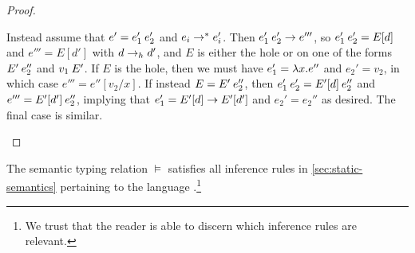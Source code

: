\begin{proof}
\begin{proofsec*}
    Instead assume that $e' = \expApp{e_1'}{e_2'}$ and $e_i \to^* e_i'$. Then $\expApp{e_1'}{e_2'} \step e'''$, so $\expApp{e_1'}{e_2'} = E[d]$ and $e''' = E[d']$ with $d \to_h d'$, and $E$ is either the hole or on one of the forms $\expApp{E'}{e_2''}$ and $\expApp{v_1}{E'}$. If $E$ is the hole, then we must have $e_1' = \expLam{x}{e''}$ and $e_2' = v_2$, in which case $e''' = e''[v_2/x]$. If instead $E = \expApp{E'}{e_2''}$, then $\expApp{e_1'}{e_2'} = \expApp{E'[d]}{e_2''}$ and $e''' = \expApp{E'[d']}{e_2''}$, implying that $e_1' = E'[d] \to E'[d']$ and $e_2' = e_2''$ as desired. The final case is similar.
\end{proofsec*}
\end{proof}


\begin{lemma}[Compatibility]
    \label{lem:logical-predicate-compatibility}
    The semantic typing relation $\vDash$ satisfies all inference rules in \cref{sec:static-semantics} pertaining to the language \langpure.\footnote{We trust that the reader is able to discern which inference rules are relevant.}
\end{lemma}

